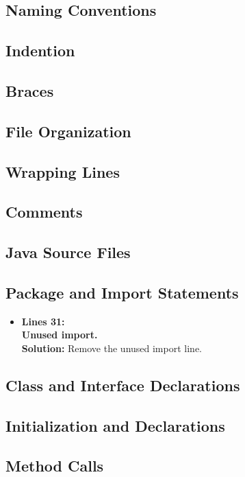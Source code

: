 

\subsection{Naming Conventions}
\subsection{Indention}
\subsection{Braces}
\subsection{File Organization}
\subsection{Wrapping Lines}
\subsection{Comments}
\subsection{Java Source Files}
\subsection{Package and Import Statements}
\begin{itemize}
	\item \textbf{Lines 31:}\\
	\textbf{Unused import.}\\
	\textbf{Solution: } Remove the unused import line.
	
\end{itemize}
\subsection{Class and Interface Declarations}
\subsection{Initialization and Declarations}
\subsection{Method Calls}
